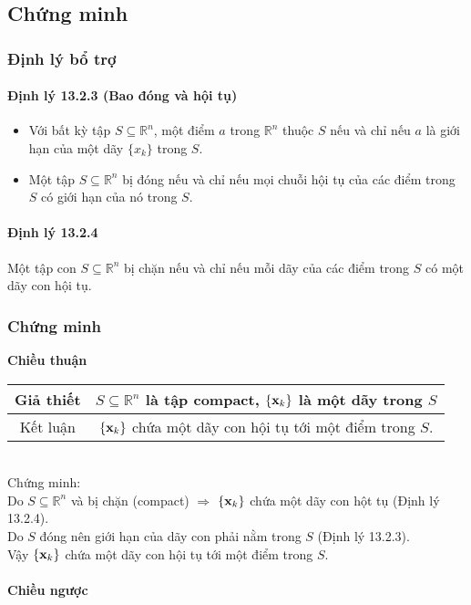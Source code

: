 \documentclass[12pt]{article}
\begin{document}
            \subsection{Chứng minh}
                \subsubsection{Định lý bổ trợ}
                    \paragraph{Định lý 13.2.3 (Bao đóng và hội tụ)}
                        \begin{itemize}
                            \item Với bất kỳ tập $S \subseteq \mathbb{R}^n$, một điểm $a$ trong $\mathbb{R}^n$ thuộc $S$ nếu và chỉ nếu $a$ là giới hạn của một dãy $\{x_k\}$ trong $S$.
                            \item Một tập $S \subseteq \mathbb{R}^n$ bị đóng nếu và chỉ nếu mọi chuỗi hội tụ của các điểm trong $S$ có giới hạn của nó trong $S$.
                        \end{itemize}
                    \paragraph{Định lý 13.2.4}
                        Một tập con $S \subseteq \mathbb{R}^n$ bị chặn nếu và chỉ nếu mỗi dãy của các điểm trong $S$ có một dãy con hội tụ.
                \subsubsection{Chứng minh}
                    {\bf Chiều thuận}\\

                        \begin{tabular}{c | c}
                            Giả thiết  &  $S \subseteq \mathbb{R}^n$ là tập compact, $\{{\bf x}_k\}$ là một dãy trong $S$\\
                            \hline 
                            Kết luận & $\{{\bf x}_k\}$ chứa một dãy con hội tụ tới một điểm trong $S$.
                        \end{tabular}\\

                        Chứng minh:\\
                        Do $ S \subseteq \mathbb{R}^n$ và bị chặn (compact) $\Rightarrow$ $\{{\bf x}_k\}$ chứa một dãy con hột tụ (Định lý 13.2.4).\\
                        Do $S$ đóng nên giới hạn của dãy con phải nằm trong $S$ (Định lý 13.2.3).\\
                        Vậy $\{{\bf x}_k\}$ chứa một dãy con hội tụ tới một điểm trong $S$.\\\\
                    {\bf Chiều ngược}\\
\end{document}
